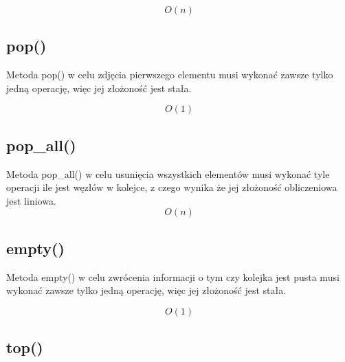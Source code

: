 \documentclass[12pt]{article}
\begin{document}
{\Large \begin{equation*}
    O(n)
\end{equation*} }

\subsection{pop()}

\begin{figure}[H]
    \centering
    
\end{figure}

Metoda pop() w celu zdjęcia pierwszego elementu musi wykonać zawsze 
tylko jedną operację, więc jej złożoność jest stała.

{\Large \begin{equation*}
    O(1)
\end{equation*} }

\subsection{pop\_all()}

\begin{figure}[H]
    \centering
    
\end{figure}
Metoda pop\_all() w celu usunięcia wszystkich elementów musi wykonać tyle operacji ile jest węzłów w kolejce,
z czego wynika że jej złożoność obliczeniowa jest liniowa.
{\Large \begin{equation*}
    O(n)
\end{equation*} }


\subsection{empty()}

\begin{figure}[H]
    \centering
    
\end{figure}

Metoda empty() w celu zwrócenia informacji o tym czy kolejka jest pusta musi wykonać zawsze 
tylko jedną operację, więc jej złożoność jest stała.

{\Large \begin{equation*}
    O(1)
\end{equation*} }

\subsection{top()}
\end{document}
